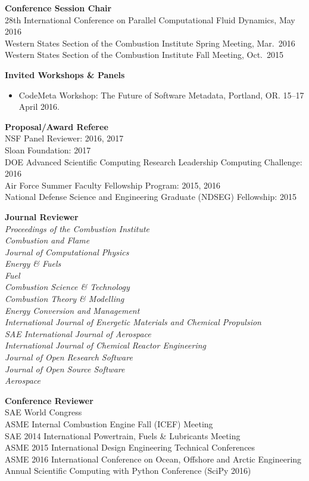 \documentclass[margin,line,11pt]{res}
\begin{document}
\begin{resume}
\textbf{Conference Session Chair} \\
28th International Conference on Parallel Computational Fluid Dynamics, May 2016 \\
Western States Section of the Combustion Institute Spring Meeting, Mar.\ 2016 \\
Western States Section of the Combustion Institute Fall Meeting, Oct.\ 2015

\textbf{Invited Workshops \& Panels}
\begin{itemize}[leftmargin=*]
\item CodeMeta Workshop: The Future of Software Metadata, Portland, OR. 15--17 April 2016.
\end{itemize}

\textbf{Proposal\slash Award Referee} \\
NSF Panel Reviewer: 2016, 2017 \\
Sloan Foundation: 2017 \\
DOE Advanced Scientific Computing Research Leadership Computing Challenge: 2016 \\
Air Force Summer Faculty Fellowship Program: 2015, 2016 \\
National Defense Science and Engineering Graduate (NDSEG) Fellowship: 2015

\textbf{Journal Reviewer} \\
\emph{Proceedings of the Combustion Institute}\\
\emph{Combustion and Flame}\\
\emph{Journal of Computational Physics}\\
\emph{Energy \& Fuels}\\
\emph{Fuel}\\
\emph{Combustion Science \& Technology}\\
\emph{Combustion Theory \& Modelling}\\
\emph{Energy Conversion and Management}\\
\emph{International Journal of Energetic Materials and Chemical Propulsion}\\
\emph{SAE International Journal of Aerospace}\\
\emph{International Journal of Chemical Reactor Engineering} \\
\emph{Journal of Open Research Software} \\
\emph{Journal of Open Source Software} \\
\emph{Aerospace}

\textbf{Conference Reviewer} \\
SAE World Congress\\
ASME Internal Combustion Engine Fall (ICEF) Meeting\\
SAE 2014 International Powertrain, Fuels \& Lubricants Meeting \\
ASME 2015 International Design Engineering Technical Conferences \\
ASME 2016  International Conference on Ocean, Offshore and Arctic Engineering \\
 Annual Scientific Computing with Python Conference (SciPy 2016)


\end{resume}
\end{document}
